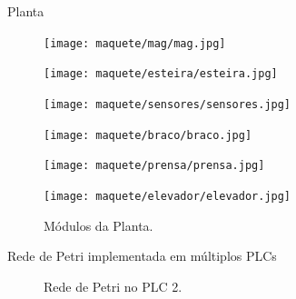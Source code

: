 \begin{frame}{Planta}
   \begin{figure}[ht]
       \begin{minipage}[b]{0.2\linewidth}
         \centering
  \texttt{[image: maquete/mag/mag.jpg]}
       \end{minipage}
       \begin{minipage}[b]{0.2\linewidth}
         \centering
  \texttt{[image: maquete/esteira/esteira.jpg]}
       \end{minipage}
       \begin{minipage}[b]{0.2\linewidth}
         \centering
  \texttt{[image: maquete/sensores/sensores.jpg]}
\end{minipage}

     
       \begin{minipage}[b]{0.2\linewidth}
         \centering
  \texttt{[image: maquete/braco/braco.jpg]}
       \end{minipage}
       \hspace{0.5cm}
       \begin{minipage}[b]{0.2\linewidth}
           \centering
  \texttt{[image: maquete/prensa/prensa.jpg]}
       \end{minipage}
       \begin{minipage}[b]{0.2\linewidth}
           \centering
         \texttt{[image: maquete/elevador/elevador.jpg]}
       \end{minipage}
  \caption{Módulos da Planta.}
   \end{figure}
\end{frame}
\begin{frame}{Rede de Petri implementada em múltiplos PLCs}
  \begin{figure}[ht]
       \begin{minipage}[b]{0.45\linewidth}
           \centering
           \caption{Rede de Petri no PLC 1.}
           \label{fig:a}
       \end{minipage}
       \hspace{0.5cm}
       \begin{minipage}[b]{0.45\linewidth}
           \centering
           \caption{Rede de Petri no PLC 2.}
           \label{fig:b}
       \end{minipage}
   \end{figure}
\end{frame}





